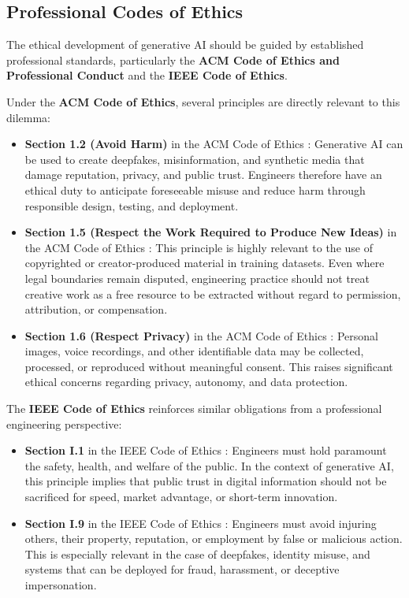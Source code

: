\subsection{Professional Codes of Ethics}

The ethical development of generative AI should be guided by established professional standards, particularly the \textbf{ACM Code of Ethics and Professional Conduct} and the \textbf{IEEE Code of Ethics}.

Under the \textbf{ACM Code of Ethics}, several principles are directly relevant to this dilemma:
\begin{itemize}
    \item \textbf{Section 1.2 (Avoid Harm)} in the ACM Code of Ethics \cite{acm}: Generative AI can be used to create deepfakes, misinformation, and synthetic media that damage reputation, privacy, and public trust. Engineers therefore have an ethical duty to anticipate foreseeable misuse and reduce harm through responsible design, testing, and deployment.
    
    \item \textbf{Section 1.5 (Respect the Work Required to Produce New Ideas)} in the ACM Code of Ethics \cite{acm}: This principle is highly relevant to the use of copyrighted or creator-produced material in training datasets. Even where legal boundaries remain disputed, engineering practice should not treat creative work as a free resource to be extracted without regard to permission, attribution, or compensation.
    
    \item \textbf{Section 1.6 (Respect Privacy)} in the ACM Code of Ethics \cite{acm}: Personal images, voice recordings, and other identifiable data may be collected, processed, or reproduced without meaningful consent. This raises significant ethical concerns regarding privacy, autonomy, and data protection.
\end{itemize}

The \textbf{IEEE Code of Ethics} reinforces similar obligations from a professional engineering perspective:
\begin{itemize}
    \item \textbf{Section I.1} in the IEEE Code of Ethics \cite{ieee}: Engineers must hold paramount the safety, health, and welfare of the public. In the context of generative AI, this principle implies that public trust in digital information should not be sacrificed for speed, market advantage, or short-term innovation.

    \item \textbf{Section I.9} in the IEEE Code of Ethics \cite{ieee}: Engineers must avoid injuring others, their property, reputation, or employment by false or malicious action. This is especially relevant in the case of deepfakes, identity misuse, and systems that can be deployed for fraud, harassment, or deceptive impersonation.
\end{itemize}

